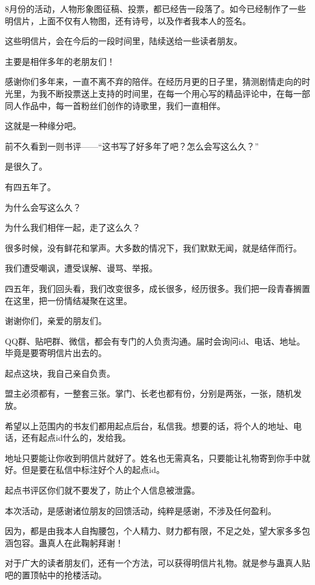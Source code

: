 \begin{this_body} \par
8月份的活动，人物形象图征稿、投票，都已经告一段落了。如今已经制作了一些明信片，上面不仅有人物图，还有诗号，以及作者我本人的签名。

这些明信片，会在今后的一段时间里，陆续送给一些读者朋友。

主要是相伴多年的老朋友们！

感谢你们多年来，一直不离不弃的陪伴。在经历月更的日子里，猜测剧情走向的时光里，为我不断投票送上支持的时间里，在每一个用心写的精品评论中，在每一部同人作品中，每一首粉丝们创作的诗歌里，我们一直相伴。

这就是一种缘分吧。

前不久看到一则书评——“这书写了好多年了吧？怎么会写这么久？”

是很久了。

有四五年了。

为什么会写这么久？

为什么我们相伴一起，走了这么久？

很多时候，没有鲜花和掌声。大多数的情况下，我们默默无闻，就是结伴而行。

我们遭受嘲讽，遭受误解、谩骂、举报。

四五年，我们回头看，我们改变很多，成长很多，经历很多。我们把一段青春搁置在这里，把一份情结凝聚在这里。

谢谢你们，亲爱的朋友们。

QQ群、贴吧群、微信，都会有专门的人负责沟通。届时会询问id、电话、地址。毕竟是要寄明信片出去的。

起点这块，我自己亲自负责。

盟主必须都有，一整套三张。掌门、长老也都有份，分别是两张，一张，随机发放。

希望以上范围内的书友们都用起点后台，私信我。想要的话，将个人的地址、电话，还有起点id什么的，发给我。

地址只要能让你收到明信片就好了。姓名也无需真名，只要能让礼物寄到你手中就好。但是要在私信中标注好个人的起点id。

起点书评区你们就不要发了，防止个人信息被泄露。

本次活动，是感谢诸位朋友的回馈活动，纯粹是感谢，不涉及任何盈利。

因为，都是由我本人自掏腰包，个人精力、财力都有限，不足之处，望大家多多包涵包容。蛊真人在此鞠躬拜谢！

对于广大的读者朋友们，还有一个方法，可以获得明信片礼物。就是参与蛊真人贴吧的置顶帖中的抢楼活动。


\end{this_body}
